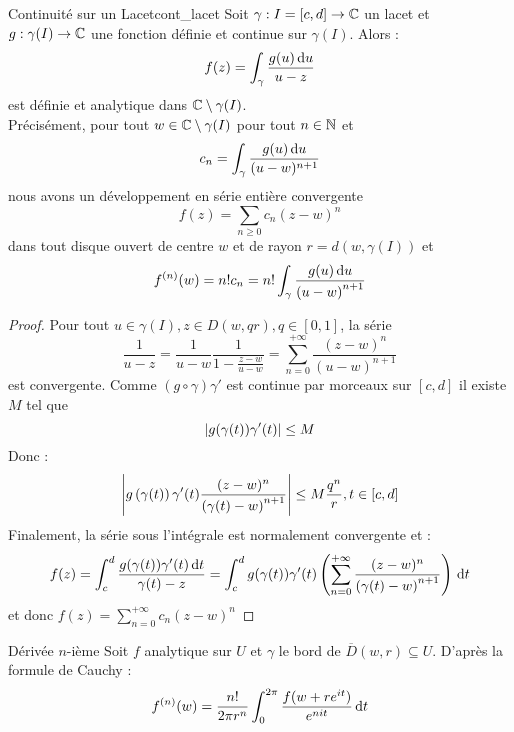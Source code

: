 \documentclass{cours}
\begin{document}
\begin{propositionfr}{Continuité sur un Lacet}{cont_lacet}
    Soit $\gamma : I = [c, d] \to \mathbb{C}$ un lacet et $g : \gamma(I) \to \mathbb{C}$ une fonction définie et continue sur $\gamma(I)$. Alors : 
    \[
        f(z) = \int_{\gamma}\frac{g(u){\rm \, d} u}{u - z}
    \]
    est définie et analytique dans $\mathbb{C} \setminus \gamma(I)$.\\
    Précisément, pour tout $w \in \mathbb{C} \setminus \gamma(I)$ pour tout $n \in \mathbb{N}$ et 
    \[
        c_{n} = \int_{\gamma} \frac{g(u){\rm \, d} u}{(u - w)^{n + 1}}
    \]
    nous avons un développement en série entière convergente 
    \[
        f(z) = \sum_{n \geq 0}c_{n}\left(z - w\right)^{n}
    \]
    dans tout disque ouvert de centre $w$ et de rayon $r = d(w, \gamma(I))$ et 
    \[
        f^{(n)}(w) = n!c_{n} = n!\int_{\gamma}\frac{g(u){\rm \, d} u}{\left(u - w\right)^{n + 1}}
    \]
\end{propositionfr}
\begin{proof}
    Pour tout $u \in \gamma(I), z \in D(w, qr), q \in [0, 1]$, la série 
    \[
        \frac{1}{u - z} = \frac{1}{u - w} \frac{1}{1 - \frac{z-w}{u-w}} = \sum_{n = 0}^{+\infty}\frac{\left(z - w\right)^{n}}{\left(u - w\right)^{n + 1}}
    \]
    est convergente. Comme $\left(g \circ \gamma\right)\gamma'$ est continue par morceaux sur $[c, d]$ il existe $M$ tel que 
    \[
        \left|g(\gamma(t))\gamma'(t)\right| \leq M
    \]
    Donc :
    \[
        \left|g\left(\gamma(t)\right)\gamma'(t)\frac{(z - w)^{n}}{\left(\gamma(t) - w\right)^{n + 1}}\right| \leq M \frac{q^{n}}{r}, t\in [c, d]
    \]
    Finalement, la série sous l'intégrale est normalement convergente et : 
    \[
        f(z) = \int_{c}^{d}\frac{g(\gamma(t))\gamma'(t){\rm \, d} t}{\gamma(t) - z} = \int_{c}^{d}g(\gamma(t))\gamma'(t)\left(\sum_{n = 0}^{+\infty}\frac{(z - w)^{n}}{\left(\gamma(t) - w\right)^{n + 1}} \right){\rm \, d} t
    \]
    et donc $f(z) = \sum_{n = 0}^{+ \infty} c_{n}(z - w)^{n}$
\end{proof}

\begin{propositionfr}{Dérivée $n$-ième}{}
    Soit $f$ analytique sur $U$ et $\gamma$ le bord de $\overline{D}(w, r) \subseteq U$. D'après la formule de Cauchy : 
    \[
        f^{(n)}(w) = \frac{n!}{2\pi r^{n}}\int_{0}^{2\pi}\frac{f(w + re^{it})}{e^{nit}}{\rm \, d} t
    \]
\end{propositionfr}
\end{document}
